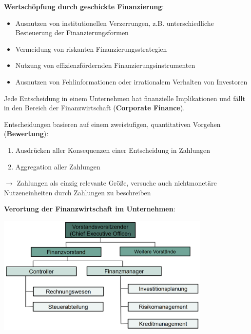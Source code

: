 \bigskip
\textbf{Wertschöpfung durch geschickte Finanzierung}:
\begin{itemize}
	\item Ausnutzen von institutionellen Verzerrungen, z.B. unterschiedliche Besteuerung der Finanzierungsformen
	\item Vermeidung von riskanten Finanzierungsstrategien
	\item Nutzung von effizienzfördernden Finanzierungsinstrumenten
	\item Ausnutzen von Fehlinformationen oder irrationalem Verhalten von Investoren
\end{itemize}

Jede Entscheidung in einem Unternehmen hat finanzielle Implikationen und fällt in den Bereich der Finanzwirtschaft (\textbf{Corporate Finance}).

Entscheidungen basieren auf einem zweistufigen, quantitativen Vorgehen (\textbf{Bewertung}):
\begin{enumerate}
	\item Ausdrücken aller Konsequenzen einer Entscheidung in Zahlungen
	\item Aggregation aller Zahlungen
\end{enumerate}
$\rightarrow$ Zahlungen als einzig relevante Größe, versuche auch nichtmonetäre Nutzeneinheiten durch Zahlungen zu beschreiben

\textbf{Verortung der Finanzwirtschaft im Unternehmen}:
\begin{center}
	\includegraphics[width=0.8\textwidth]{images/fr-in-comp.png}
\end{center}